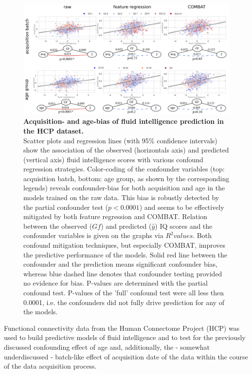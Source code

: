 \documentclass{article}
\begin{document}
\begin{figure}[!b]
  \centering
  \includegraphics[width=0.75\paperwidth]{fig/fig_hcp.png}
  \caption{\textbf{Acquisition- and age-bias of fluid intelligence prediction in the HCP dataset.} \\
  Scatter plots and regression lines (with 95\% confidence intervals) show the association of the observed (horizontals axis) and predicted (vertical axis) fluid intelligence scores with various confound regression strategies. Color-coding of the confounder variables (top: acquisition batch, bottom: age group, as shown by the corresponding legends) reveals confounder-bias for both acquisition and age in the models trained on the raw data. This bias is robustly detected by the partial confounder test ($p<0.0001$) and seems to be effectively mitigated by both feature regression and COMBAT.
  Relation between the observed ($Gf$) and predicted ($\hat{y}$) IQ scores and the confounder variables is given on the graphs via $R^2 values$. Both confound mitigation techniques, but especially COMBAT, improves the predictive performance of the models.
  Solid red line between the confounder and the prediction means significant confounder bias, whereas blue dashed line denotes that confounder testing provided no evidence for bias. P-values are determined with the partial confound test. P-values of the 'full' confound test were all less then 0.0001, i.e. the confounders did not fully drive prediction for any of the models.
  }
  \label{fig:hcp}
\end{figure}

Functional connectivity data from the Human Connectome Project (HCP) \citep{van2013wu} was used to build predictive models of fluid intelligence and to test for the previously discussed confounding effect of age \citep{lohmann2021predicting, dubois2018distributed} and,  additionally, the - somewhat underdiscussed - batch-like effect of acquisition date of the data within the course of the data acquisition process.
\end{document}
